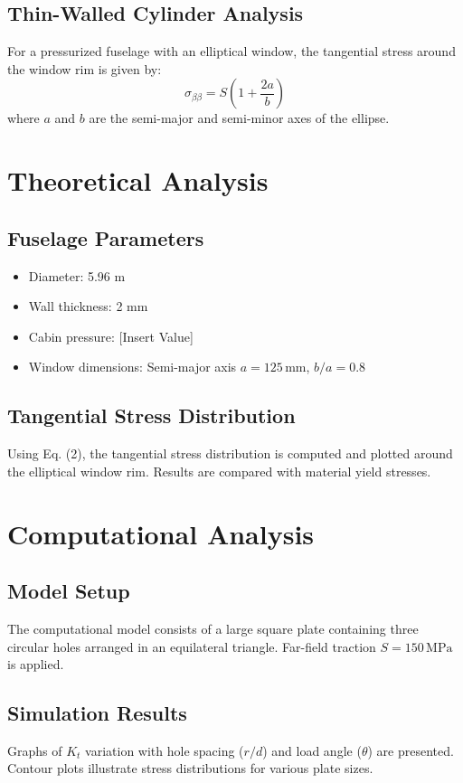 \documentclass[a4paper,11pt]{article}
\begin{document}
\subsection{Thin-Walled Cylinder Analysis}
For a pressurized fuselage with an elliptical window, the tangential stress around the window rim is given by:
\begin{equation}
    \sigma_{\beta\beta} = S \left( 1 + \frac{2a}{b} \right)
\end{equation}
where \(a\) and \(b\) are the semi-major and semi-minor axes of the ellipse.

\section{Theoretical Analysis}
\subsection{Fuselage Parameters}
\begin{itemize}
    \item Diameter: 5.96 m
    \item Wall thickness: 2 mm
    \item Cabin pressure: [Insert Value]
    \item Window dimensions: Semi-major axis \(a = 125 \, \text{mm}\), \(b/a = 0.8\)
\end{itemize}

\subsection{Tangential Stress Distribution}
Using Eq. (2), the tangential stress distribution is computed and plotted around the elliptical window rim. Results are compared with material yield stresses.

\section{Computational Analysis}
\subsection{Model Setup}
The computational model consists of a large square plate containing three circular holes arranged in an equilateral triangle. Far-field traction \(S = 150 \, \text{MPa}\) is applied.

\subsection{Simulation Results}
Graphs of \(K_t\) variation with hole spacing (\(r/d\)) and load angle (\(\theta\)) are presented. Contour plots illustrate stress distributions for various plate sizes.
\end{document}
